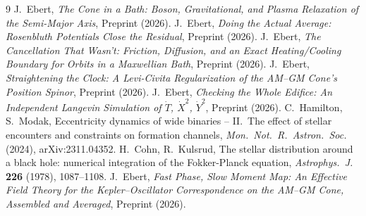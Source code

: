 \documentclass[12pt]{amsart}
\theoremstyle{plain}
\theoremstyle{remark}
\begin{document}
\begin{thebibliography}{9}
 J.~Ebert, \emph{The Cone in a Bath: Boson, Gravitational, and Plasma Relaxation of the Semi-Major Axis}, Preprint (2026).
 J.~Ebert, \emph{Doing the Actual Average: Rosenbluth Potentials Close the Residual}, Preprint (2026).
 J.~Ebert, \emph{The Cancellation That Wasn't: Friction, Diffusion, and an Exact Heating/Cooling Boundary for Orbits in a Maxwellian Bath}, Preprint (2026).
 J.~Ebert, \emph{Straightening the Clock: A Levi-Civita Regularization of the AM--GM Cone's Position Spinor}, Preprint (2026).
 J.~Ebert, \emph{Checking the Whole Edifice: An Independent Langevin Simulation of $\dot T$, $\dot X^2$, $\dot Y^2$}, Preprint (2026).
 C.~Hamilton, S.~Modak, Eccentricity dynamics of wide binaries -- II.\ The effect of stellar encounters and constraints on formation channels, \emph{Mon.\ Not.\ R.\ Astron.\ Soc.} (2024), arXiv:2311.04352.
 H.~Cohn, R.~Kulsrud, The stellar distribution around a black hole: numerical integration of the Fokker-Planck equation, \emph{Astrophys.\ J.} \textbf{226} (1978), 1087--1108.
 J.~Ebert, \emph{Fast Phase, Slow Moment Map: An Effective Field Theory for the Kepler--Oscillator Correspondence on the AM--GM Cone, Assembled and Averaged}, Preprint (2026).
\end{thebibliography}
\end{document}
